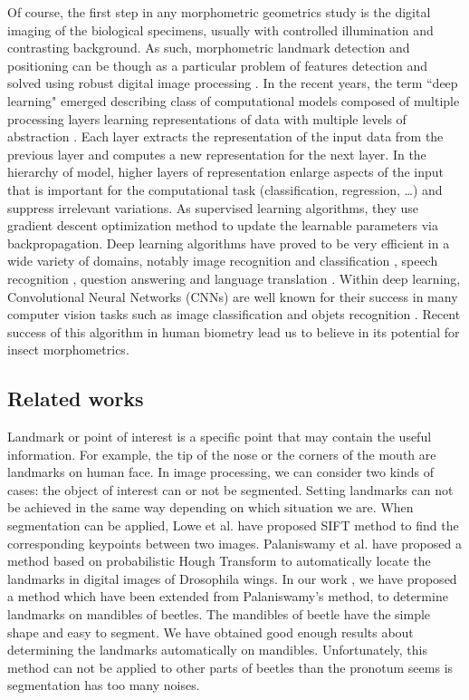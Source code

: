 \documentclass[review]{elsarticle}
\begin{document}
Of course, the first step in any morphometric geometrics study is the digital imaging of the biological specimens, usually with controlled illumination and contrasting background. As such, morphometric landmark detection and positioning can be though as a particular problem of features detection and solved using robust digital image processing \cite{gonzalez_digital_2006}. In the recent years, the term ``deep learning" emerged describing class of computational models composed of multiple processing layers learning representations of data with multiple levels of abstraction \cite{lecun2015deep}. Each layer extracts the representation of the input data from the previous layer and computes a new representation for the next layer. In the hierarchy of model, higher layers of representation enlarge aspects of the input that is important for the computational task (classification, regression, \ldots) and suppress irrelevant variations. As supervised learning algorithms, they use gradient descent optimization method to update the learnable parameters via backpropagation. Deep learning algorithms have proved to be very efficient in a wide variety of domains, notably image recognition and classification \cite{krizhevsky2012imagenet,ciregan2012multi,szegedy2015going}, speech recognition \cite{mikolov2011strategies, hinton2012deep, sainath2013deep}, question answering \cite{bordes2014question} and language translation \cite{sutskever2014sequence, jean2014using}.
Within deep learning, Convolutional Neural Networks (CNNs) are well known for their success in many computer vision tasks such as image classification \cite{krizhevsky2012imagenet,ciregan2012multi} and  objets recognition \cite{li2015convolutional,tompson2014joint}.
Recent success of this algorithm in human biometry \cite{cintas2016automatic} lead us to believe in its potential for insect morphometrics.  

\subsection{Related works}\label{rw}

Landmark or point of interest is a specific point that may contain the useful information. For example, the tip of the nose or the corners of the mouth are landmarks on human face. In image processing, we can consider two kinds of cases: the object of interest can or not be segmented. Setting landmarks can not be achieved in the same way depending on which situation we are. When segmentation can be applied, Lowe et al. \cite{lowe2004distinctive} have proposed SIFT method to find the corresponding keypoints between two images. Palaniswamy et al. \cite{palaniswamy2010automatic} have proposed a method based on probabilistic Hough Transform to automatically locate the landmarks in digital images of Drosophila wings. In our work \cite{le2017maelab}, we have proposed a method which have been extended from Palaniswamy's method, to determine landmarks on mandibles of beetles. The mandibles of beetle have the simple shape and easy to segment. We have obtained good enough results about determining the landmarks automatically on mandibles. Unfortunately, this method can not be applied to other parts of beetles than the pronotum seems is segmentation has too many noises.
\end{document}
